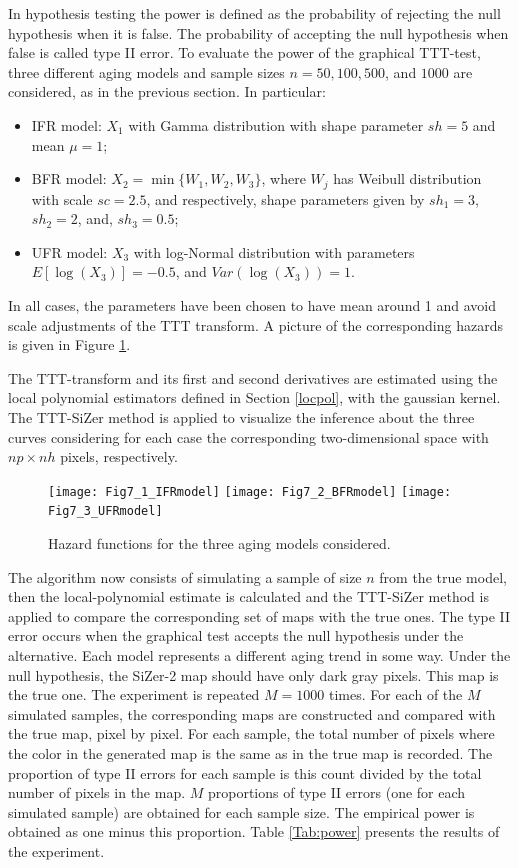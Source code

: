 \documentclass[preprint,12pt]{elsarticle}
\begin{document}
In hypothesis testing the power is defined as the probability of rejecting the null hypothesis when it is false. The probability of accepting the null hypothesis when false is called type II error. To evaluate the power of the graphical TTT-test, three  different aging models and sample sizes $n = 50, 100, 500$, and $1000$ are considered, as in the previous section.  In particular:
\begin{itemize}
\item IFR model: $X_1$ with Gamma distribution with shape parameter $sh=5$ and mean $\mu=1$;
\item BFR model: $X_2= \min\{W_1, W_2, W_3\}$, where $W_j$ has Weibull distribution with scale $sc=2.5$, and respectively, shape parameters given by $sh_1=3$, $sh_2=2$, and, $sh_3=0.5$;
\item UFR model: $X_3$ with log-Normal distribution with parameters $E[ \log (X_3)]=-0.5$, and $Var(\log(X_3))=1$.
\end{itemize}
In all cases, the parameters have been chosen to have mean around 1 and avoid scale adjustments of the TTT transform. A picture of the corresponding hazards is given in Figure \ref{models}.

The TTT-transform and its first and second derivatives are estimated using the local polynomial estimators defined in Section \ref{locpol}, with the gaussian kernel. The TTT-SiZer method is applied to visualize the inference about the three curves considering for each case the corresponding two-dimensional space with $np \times nh$ pixels, respectively.  

\begin{figure}[h]\centering
        \texttt{[image: Fig7\_1\_IFRmodel]}%
				\texttt{[image: Fig7\_2\_BFRmodel]}%
				\texttt{[image: Fig7\_3\_UFRmodel]}%
\caption{{Hazard functions for the three aging models considered}.} \label{models}
\end{figure}

The algorithm now consists of simulating a sample of size $n$ from the true model, then  the local-polynomial estimate is calculated and the TTT-SiZer method is applied to compare the corresponding set of maps with the true ones.
The type II error occurs when the graphical test accepts the null hypothesis under the alternative. Each model represents a different  aging trend in some way. Under the null  hypothesis, the SiZer-2 map  should have only dark gray pixels. This map is the true one. The experiment is repeated $M=1000$ times.  For each of the $M$ simulated samples,  the corresponding maps are constructed and compared with the true map, pixel by pixel. For each sample, the total number of pixels where the color in the generated map is  the same as in the true map is recorded. The proportion of type II errors for each sample is this count divided by the total number of pixels in the map. $M$ proportions of type II errors (one for each simulated sample) are obtained for each sample size. The empirical power is obtained as one minus this proportion. Table \ref{Tab:power} presents the results of the experiment.
\end{document}
